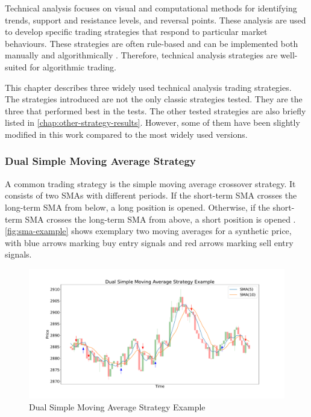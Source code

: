 Technical analysis focuses on visual and computational methods for identifying trends, support and resistance levels, and reversal points.
These analysis are used to develop specific trading strategies that respond to particular market behaviours.
These strategies are often rule-based and can be implemented both manually and algorithmically \cite{ta-basics}.
Therefore, technical analysis strategies are well-suited for algorithmic trading.

This chapter describes three widely used technical analysis trading strategies.
The strategies introduced are not the only classic strategies tested.
They are the three that performed best in the tests.
The other tested strategies are also briefly listed in \autoref{chap:other-strategy-results}.
However, some of them have been slightly modified in this work compared to the most widely used versions.

\subsubsection{Dual Simple Moving Average Strategy}
\label{chap:sma2}

A common trading strategy is the simple moving average crossover strategy.
It consists of two SMAs with different periods.
If the short-term SMA crosses the long-term SMA from below, a long position is opened.
Otherwise, if the short-term SMA crosses the long-term SMA from above, a short position is opened \cite{sma-strategy-basics}.
\autoref{fig:sma-example} shows exemplary two moving averages for a synthetic price, with blue arrows marking buy entry signals and red arrows marking sell entry signals.

\begin{figure}[H]
    \centering
    \includegraphics[width=\textwidth]{images/trading-strategies/sma-example}
    \caption{Dual Simple Moving Average Strategy Example}
    \label{fig:sma-example}
\end{figure}


